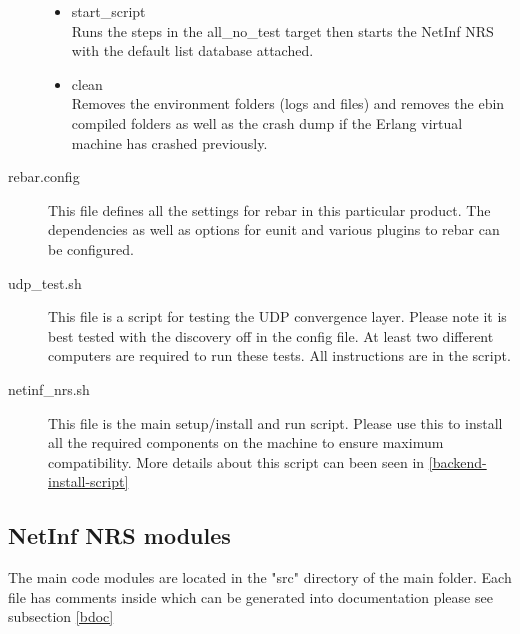 \begin{description}
\begin{itemize}
\item start\_script \\
Runs the steps in the all\_no\_test target then starts the NetInf NRS with the default list database attached.
\item clean \\
Removes the environment folders (logs and files) and removes the ebin compiled folders as well as the crash dump if the Erlang virtual machine has crashed previously.
\end{itemize}
\item[rebar.config]
This file defines all the settings for rebar in this particular product. The dependencies as well as options for eunit and various plugins to rebar can be configured.
\item[udp\_test.sh]
This file is a script for testing the UDP convergence layer. Please note it is best tested with the discovery off in the config file. At least two different computers are required to run these tests. All instructions are in the script. 
\item[netinf\_nrs.sh]
This file is the main setup/install and run script. Please use this to install all the required components on the machine to ensure maximum compatibility. More details about this script can been seen in \ref{backend-install-script}
\end{description}

\subsection {NetInf NRS modules}

The main code modules are located in the "src" directory of the main folder. Each file has comments inside which can be generated into documentation please see subsection \ref{bdoc}


